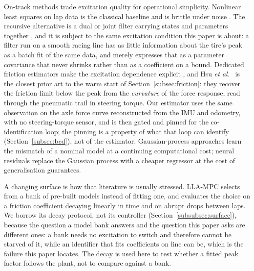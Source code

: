 \documentclass[lineno,12pt]{sn-jnl}
\theoremstyle{thmstyleone}%
\theoremstyle{thmstyletwo}%
\theoremstyle{thmstylethree}%
\begin{document}
On-track methods trade excitation quality for operational simplicity. Nonlinear
least squares on lap data is the classical baseline and is brittle under noise
\cite{ontrack2025}. The recursive alternative is a dual or joint filter carrying
states and parameters together \cite{wenzel2006dekf,sierra2006cornering}, and it
is subject to the same excitation condition this paper is about: a filter run on
a smooth racing line has as little information about the tire's peak as a batch
fit of the same data, and merely expresses that as a parameter covariance that
never shrinks rather than as a coefficient on a bound. Dedicated friction
estimators make the excitation dependence explicit
\cite{rajamani2012wheelfriction,ahn2013friction,acosta2017friction,khaleghian2017survey},
and Hsu \emph{et al.}~\cite{hsu2010trail} is the closest prior art to the warm
start of Section~\ref{subsec:friction}: they recover the friction limit below
the peak from the \emph{curvature} of the force response, read through the
pneumatic trail in steering torque. Our estimator uses the same observation on
the axle force curve reconstructed from the IMU and odometry, with no
steering-torque sensor, and is then gated and pinned for the co-identification
loop; the pinning is a property of what that loop can identify
(Section~\ref{subsec:bcd}), not of the estimator.
Gaussian-process approaches learn the mismatch of a nominal
model \cite{hewing2018cautious,hewing2020cautious,kabzan2019lbmpc} at a
continuing computational cost; neural residuals replace the Gaussian process
with a cheaper regressor at the cost of generalisation guarantees.

A changing surface is how that literature is usually stressed. LLA-MPC
\cite{llampc2025} selects from a bank of pre-built models instead of fitting
one, and evaluates the choice on a friction coefficient decaying linearly in
time and on abrupt drops between laps. We borrow its decay protocol, not
its controller (Section~\ref{subsubsec:surface}), because the question a model
bank answers and the question this paper asks are different ones: a bank needs
no excitation to switch and therefore cannot be starved of it, while an
identifier that fits coefficients on line can be, which is the failure this
paper locates. The decay is used here to test whether a fitted peak factor
follows the plant, not to compare against a bank.
\end{document}
